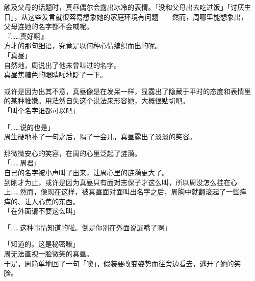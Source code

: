 触及父母的话题时，真昼偶尔会露出冰冷的表情。「没和父母出去吃过饭」「讨厌生日」，从这些发言就很容易想象她的家庭环境有问题——然而，周哪里能想象出，父母连她的名字都不会喊呢。\\

『……真好啊』\\

方才的那句细语，究竟是以何种心情编织而出的呢。\\

「真昼」\\

自然地，周说出了他未曾叫过的名字。\\

真昼焦糖色的眼睛啪地眨了一下。

或许是因为出其不意，真昼像是在发呆一样，显露出了隐藏于平时的态度和表情里的某种稚嫩。用茫然自失这个说法来形容她，大概很贴切吧。\\

「叫个名字谁都可以吧」

「……说的也是」\\

周生硬地补了一句之后，隔了一会儿，真昼露出了淡淡的笑容。

那微微安心的笑容，在周的心里泛起了涟漪。\\

「……周君」\\

自己的名字被小声叫了出来，让周心里的涟漪更大了。\\

到刚才为止，或许是因为真昼只有面对志保子才这么叫，所以周没怎么挂在心上……然而，像现在这样，被真昼面对面叫出名字之后，周胸中就翻滚起了一些痒痒的、让人心焦的东西。\\

「在外面请不要这么叫」

「……这种事情知道的啦。倒是你别在外面说漏嘴了啊」

「知道的。这是秘密嘛」\\

周无法直视一脸微笑的真昼。\\

于是，周简单地回了一句「噢」，假装要改变姿势而往旁边看去，逃开了她的笑脸。
